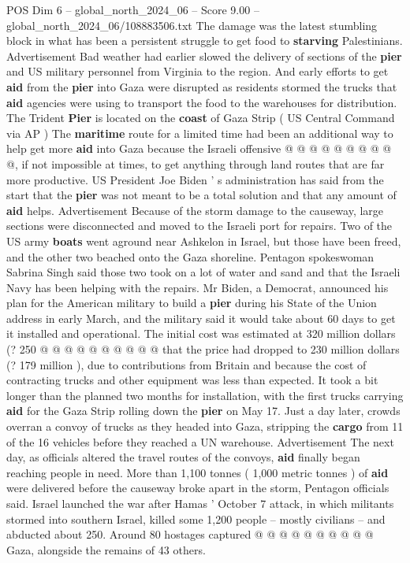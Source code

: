 \begin{textsample}{POS Dim 6 – global\_north\_2024\_06 – Score 9.00 – global\_north\_2024\_06/108883506.txt}
The damage was the latest stumbling block in what has been a persistent struggle to get food to \textbf{starving} Palestinians.
Advertisement Bad weather had earlier slowed the delivery of sections of the \textbf{pier} and US military personnel from Virginia to the region.
And early efforts to get \textbf{aid} from the \textbf{pier} into Gaza were disrupted as residents stormed the trucks that \textbf{aid} agencies were using to transport the food to the warehouses for distribution.
The Trident \textbf{Pier} is located on the \textbf{coast} of Gaza Strip ( US Central Command via AP ) The \textbf{maritime} route for a limited time had been an additional way to help get more \textbf{aid} into Gaza because the Israeli offensive @ @ @ @ @ @ @ @ @ @, if not impossible at times, to get anything through land routes that are far more productive.
US President Joe Biden ' s administration has said from the start that the \textbf{pier} was not meant to be a total solution and that any amount of \textbf{aid} helps.
Advertisement Because of the storm damage to the causeway, large sections were disconnected and moved to the Israeli port for repairs.
Two of the US army \textbf{boats} went aground near Ashkelon in Israel, but those have been freed, and the other two beached onto the Gaza shoreline.
Pentagon spokeswoman Sabrina Singh said those two took on a lot of water and sand and that the Israeli Navy has been helping with the repairs.
Mr Biden, a Democrat, announced his plan for the American military to build a \textbf{pier} during his State of the Union address in early March, and the military said it would take about 60 days to get it installed and operational.
The initial cost was estimated at 320 million dollars (? 250 @ @ @ @ @ @ @ @ @ @ that the price had dropped to 230 million dollars (? 179 million ), due to contributions from Britain and because the cost of contracting trucks and other equipment was less than expected.
It took a bit longer than the planned two months for installation, with the first trucks carrying \textbf{aid} for the Gaza Strip rolling down the \textbf{pier} on May 17.
Just a day later, crowds overran a convoy of trucks as they headed into Gaza, stripping the \textbf{cargo} from 11 of the 16 vehicles before they reached a UN warehouse.
Advertisement The next day, as officials altered the travel routes of the convoys, \textbf{aid} finally began reaching people in need.
More than 1,100 tonnes ( 1,000 metric tonnes ) of \textbf{aid} were delivered before the causeway broke apart in the storm, Pentagon officials said.
Israel launched the war after Hamas ' October 7 attack, in which militants stormed into southern Israel, killed some 1,200 people -- mostly civilians -- and abducted about 250.
Around 80 hostages captured @ @ @ @ @ @ @ @ @ @ Gaza, alongside the remains of 43 others.

\end{textsample}

